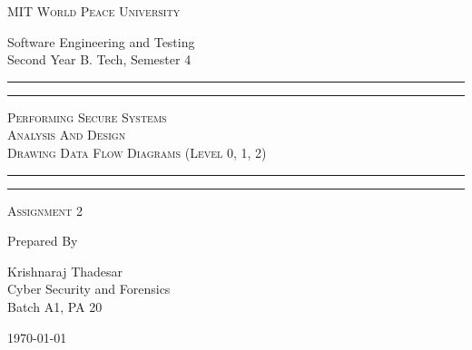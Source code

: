 \documentclass[11pt]{article}
\begin{document}
\begin{titlepage}
	\centering


	\huge\textsc{
		MIT World Peace University
	}\\

	\vspace{0.75\baselineskip} %

	\LARGE{
		Software Engineering and Testing\\
		Second Year B. Tech, Semester 4
	}

	\vfill %


	\rule{\textwidth}{1.6pt}\vspace*{-\baselineskip}\vspace*{2pt}
	\rule{\textwidth}{0.6pt}
	\vspace{0.75\baselineskip} %



	\huge{\textsc{
			Performing Secure Systems\\ Analysis And Design \\
			Drawing Data Flow Diagrams (Level 0, 1, 2)
		}} \\



	\vspace{0.5\baselineskip} %
	\rule{\textwidth}{0.6pt}\vspace*{-\baselineskip}\vspace*{2.8pt}
	\rule{\textwidth}{1.6pt}

	\vspace{1\baselineskip} %


	\LARGE\textsc{
		Assignment 2
	} %
	\vfill


	Prepared By
	\vspace{0.5\baselineskip} %

	\Large{
		Krishnaraj Thadesar \\
		Cyber Security and Forensics\\
		Batch A1, PA 20
	}


	\vspace{0.5\baselineskip} %
	\today

\end{titlepage}
\end{document}
